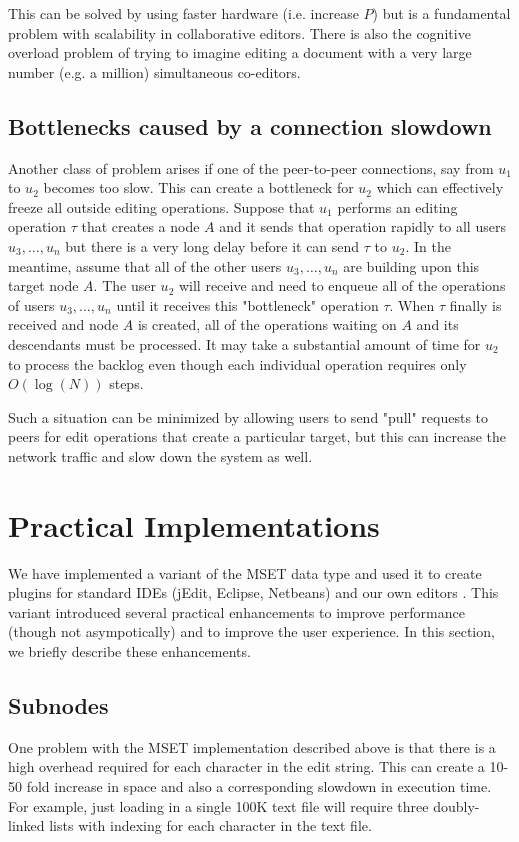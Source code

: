 \documentclass{amsart}
\begin{document}
This can be solved by using faster hardware (i.e. increase $P$) but is a fundamental
problem with scalability in collaborative editors.  There is also the cognitive overload problem of trying to imagine editing a document with a very large
number (e.g. a million) simultaneous co-editors.   

\subsection{Bottlenecks caused by a connection slowdown}
Another class of problem arises if one of the peer-to-peer connections, say from $u_1$ to $u_2$ becomes too slow. This can create a bottleneck for $u_2$ which
can effectively freeze all outside editing operations. 
Suppose that $u_1$ performs 
an editing operation $\tau$ that creates a node $A$ and it sends that operation rapidly to
all users $u_3,\ldots,u_n$ but there is a very long delay before it can send $\tau$ to $u_2$.  In the meantime, assume that
all of the other users $u_3,\ldots,u_n$ are building upon
this target node $A$. The user $u_2$ will receive and need to enqueue all of the operations of users $u_3,\ldots, u_n$ until it receives this "bottleneck" operation $\tau$. When $\tau$ finally is
received and node $A$ is created, all of the operations waiting on $A$ and its descendants must be processed.  It may take a substantial amount of time for $u_2$ to process the backlog
even though each individual operation requires only $O(\log(N))$ steps.  

Such a situation can be minimized by allowing users to send "pull" requests to peers for edit operations that create a particular target, but this can increase the network traffic and slow down the system as well.


\section{Practical Implementations}
\label{sec:implementation}
We have implemented a variant of the MSET data type and used it to create plugins for standard IDEs (jEdit, Eclipse, Netbeans) and our own editors \cite{granville_collabed:_2009}.  This variant introduced several
practical enhancements to improve performance (though not asympotically)
and to improve the user experience.  In this section, we briefly describe these
enhancements.

\subsection{Subnodes}
One problem with the MSET implementation described above is that there is a high overhead required for each character in the edit string. This can create a 10-50 fold increase in space and also a corresponding slowdown in execution time. For example, just loading in a single 100K text file will require three doubly-linked lists with indexing for each character in the text file.
\end{document}
